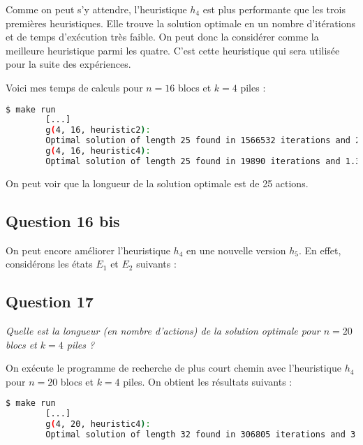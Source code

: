 Comme on peut s'y attendre, l'heuristique $h_4$ est plus performante que les trois premières heuristiques. Elle trouve la solution optimale en un nombre d'itérations et de temps d'exécution très faible. On peut donc la considérer comme la meilleure heuristique parmi les quatre. C'est cette heuristique qui sera utilisée pour la suite des expériences.

Voici mes temps de calculs pour $n = 16$ blocs et $k = 4$ piles :

\begin{minipage}{\dimexpr\linewidth-20pt}
    \begin{lstlisting}[language=bash, caption={Résultats de l'exécution du programme de recherche de plus court chemin avec l'heuristique $h_4$ pour $k = 4$ piles et $n = 8$ blocs.}, label={lst:plus_court_chemin_results_h4_first_res}]
        $ make run
        [...]
        g(4, 16, heuristic2): 
        Optimal solution of length 25 found in 1566532 iterations and 21.5822 seconds
        g(4, 16, heuristic4): 
        Optimal solution of length 25 found in 19890 iterations and 1.32529 seconds
    \end{lstlisting}
\end{minipage}

On peut voir que la longueur de la solution optimale est de 25 actions.

\subsection{Question 16 bis}

On peut encore améliorer l'heuristique $h_4$ en une nouvelle version $h_5$. En effet, considérons les états $E_1$ et $E_2$ suivants :

\subsection{Question 17}

\textit{Quelle est la longueur (en nombre d'actions) de la solution optimale pour $n = 20$ blocs et $k = 4$ piles ?}

On exécute le programme de recherche de plus court chemin avec l'heuristique $h_4$ pour $n = 20$ blocs et $k = 4$ piles. On obtient les résultats suivants :

\begin{minipage}{\dimexpr\linewidth-20pt}
    \begin{lstlisting}[language=bash, caption={Résultats de l'exécution du programme de recherche de plus court chemin avec l'heuristique $h_4$ pour $k = 4$ piles et $n = 20$ blocs.}, label={lst:plus_court_chemin_results_h4_k4_n20}]
        $ make run
        [...]
        g(4, 20, heuristic4): 
        Optimal solution of length 32 found in 306805 iterations and 3.11438 seconds
    \end{lstlisting}
\end{minipage}

